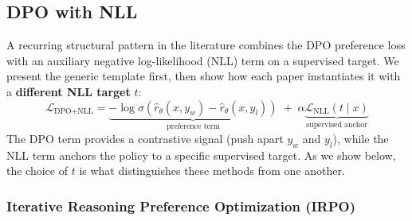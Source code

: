 \subsection{DPO with NLL}
\label{sec:dpo-nll}

A recurring structural pattern in the literature combines the DPO preference loss with an auxiliary negative log-likelihood (NLL) term on a supervised target. We present the generic template first, then show how each paper instantiates it with a \textbf{different NLL target} $t$:
\begin{equation}
    \mathcal{L}_{\text{DPO+NLL}} = \underbrace{-\log \sigma\!\left(\hat{r}_\theta(x, y_w) - \hat{r}_\theta(x, y_l)\right)}_{\text{preference term}} \;+\; \alpha \underbrace{\mathcal{L}_{\text{NLL}}(t \mid x)}_{\text{supervised anchor}}
    \label{eq:dpo_nll_template}
\end{equation}
The DPO term provides a contrastive signal (push apart $y_w$ and $y_l$), while the NLL term anchors the policy to a specific supervised target. As we show below, the choice of $t$ is what distinguishes these methods from one another.

\subsubsection{Iterative Reasoning Preference Optimization (IRPO)}
\label{sec:irpo}

